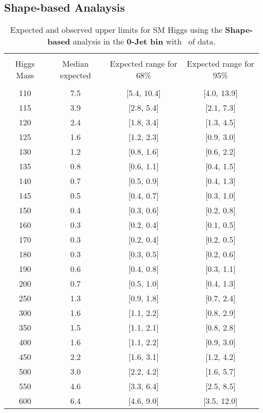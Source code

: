 \subsection{Shape-based Analaysis}
\begin{table}[hbp!]
\begin{center}
\begin{tabular}{c c c c}
\hline
\vspace{-3mm} && \\
 Higgs Mass   & Median expected & Expected range for 68\% & Expected range for 95\%   \\
\vspace{-3mm} && \\
\hline
110 & 7.5 & [5.4, 10.4] & [4.0, 13.9] \\
115 & 3.9 & [2.8, 5.4] & [2.1, 7.3] \\
120 & 2.4 & [1.8, 3.4] & [1.3, 4.5] \\
125 & 1.6 & [1.2, 2.3] & [0.9, 3.0] \\
130 & 1.2 & [0.8, 1.6] & [0.6, 2.2] \\
135 & 0.8 & [0.6, 1.1] & [0.4, 1.5] \\
140 & 0.7 & [0.5, 0.9] & [0.4, 1.3] \\
145 & 0.5 & [0.4, 0.7] & [0.3, 1.0] \\
150 & 0.4 & [0.3, 0.6] & [0.2, 0.8] \\
160 & 0.3 & [0.2, 0.4] & [0.1, 0.5] \\
170 & 0.3 & [0.2, 0.4] & [0.2, 0.5] \\
180 & 0.3 & [0.3, 0.5] & [0.2, 0.6] \\
190 & 0.6 & [0.4, 0.8] & [0.3, 1.1] \\
200 & 0.7 & [0.5, 1.0] & [0.4, 1.3] \\
250 & 1.3 & [0.9, 1.8] & [0.7, 2.4] \\
300 & 1.6 & [1.1, 2.2] & [0.8, 2.9] \\
350 & 1.5 & [1.1, 2.1] & [0.8, 2.8] \\
400 & 1.6 & [1.1, 2.2] & [0.9, 3.0] \\
450 & 2.2 & [1.6, 3.1] & [1.2, 4.2] \\
500 & 3.0 & [2.2, 4.2] & [1.6, 5.7] \\
550 & 4.6 & [3.3, 6.4] & [2.5, 8.5] \\
600 & 6.4 & [4.6, 9.0] & [3.5, 12.0] \\
\hline
\end{tabular}
\caption{Expected and observed upper limits for SM Higgs using the
  {\bf Shape-based} analysis in the {\bf 0-Jet bin} with \intlumiEightTeV\ of data.}
\label{tab:bdtbase_uls_0j}
\end{center}
\end{table}
